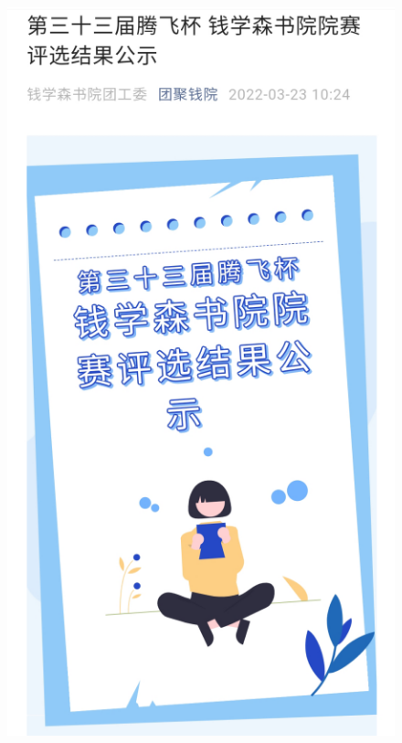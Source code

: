 \documentclass[
decoration,  %
]{qyxf-book}
\begin{document}
			\begin{figure}[H]
        		\centering
        		\begin{minipage}{5cm}
        		\includegraphics[]{pics/shsj1.png}
        		\end{minipage}
        		\begin{minipage}{5cm}

\end{minipage}
\end{figure}
\end{document}
